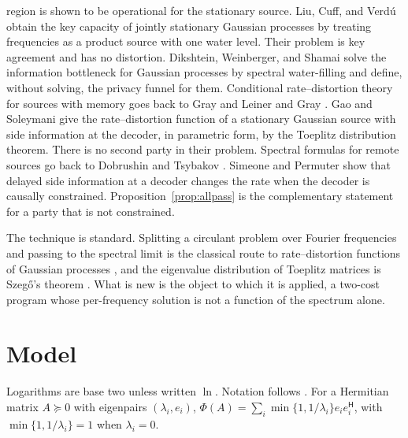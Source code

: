 \documentclass[11pt,onecolumn]{IEEEtran}
\newcommand{\herm}{\mathsf H}
\begin{document}
region is shown to be operational for the stationary source.
Liu, Cuff, and Verd\'u \cite{liu2016} obtain the key capacity of jointly
stationary Gaussian processes by treating frequencies as a product
source with one water level. Their problem is key agreement and has no
distortion. Dikshtein, Weinberger, and Shamai \cite{dikshtein2022}
solve the information bottleneck for Gaussian processes by spectral
water-filling and define, without solving, the privacy funnel for
them. Conditional rate--distortion theory for sources with memory goes
back to Gray \cite{gray1973} and Leiner and Gray \cite{leiner1974}. Gao
and Soleymani \cite{gao2010} give the rate--distortion function of a
stationary Gaussian source with side information at the decoder, in
parametric form, by the Toeplitz distribution theorem. There is no
second party in their problem. Spectral formulas for remote sources
go back to Dobrushin and Tsybakov \cite{dobrushin1962}. Simeone and Permuter \cite{simeone2013} show that
delayed side information at a decoder changes the rate when the
decoder is causally constrained. Proposition~\ref{prop:allpass} is the
complementary statement for a party that is not constrained.

The technique is standard. Splitting a circulant problem over Fourier
frequencies and passing to the spectral limit is the classical route
to rate--distortion functions of Gaussian processes
\cite{berger1971,pearl1973,gray2006}, and the eigenvalue distribution
of Toeplitz matrices is Szeg\H{o}'s theorem
\cite{grenander1958,gray2006}. What is new is the object to which it is
applied, a two-cost program whose per-frequency solution is not a
function of the spectrum alone.

\section{Model}
\label{sec:model}

Logarithms are base two unless written $\ln$. Notation follows
\cite{part1}. For a Hermitian matrix $A\succeq0$ with eigenpairs
$(\lambda_i,e_i)$,
$\Phi(A)=\sum_i\min\{1,1/\lambda_i\}e_ie_i^{\herm}$, with
$\min\{1,1/\lambda_i\}=1$ when $\lambda_i=0$.
\end{document}
